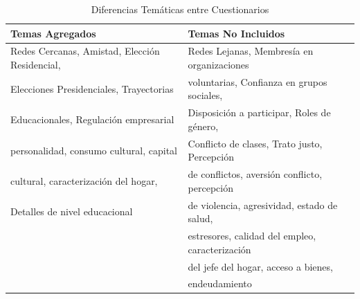 \documentclass[12pt]{report}
\begin{document}
\begin{table}[H]
	\footnotesize
	\centering
	\caption{Diferencias Temáticas entre Cuestionarios}
	\label{table:difcuest}
	\begin{tabular}{l l}
		\toprule
		\textbf{Temas Agregados}&\textbf{Temas No Incluidos}\\
		\midrule
Redes Cercanas, Amistad, Elección Residencial,  & Redes Lejanas, Membresía en organizaciones\\
Elecciones Presidenciales, Trayectorias               &  voluntarias, Confianza en grupos sociales,\\
Educacionales, Regulación empresarial                & Disposición a participar, Roles de género,\\
personalidad, consumo cultural, capital & Conflicto de clases, Trato justo, Percepción  \\
cultural, caracterización del hogar, & de conflictos, aversión conflicto, percepción  \\
Detalles de nivel educacional & de violencia, agresividad, estado de salud, \\
& estresores, calidad del empleo, caracterización \\
& del jefe del hogar, acceso a bienes, \\
& endeudamiento\\ 
		\bottomrule
	\end{tabular}
\end{table}





\newcolumntype{b}{X}
\end{document}
